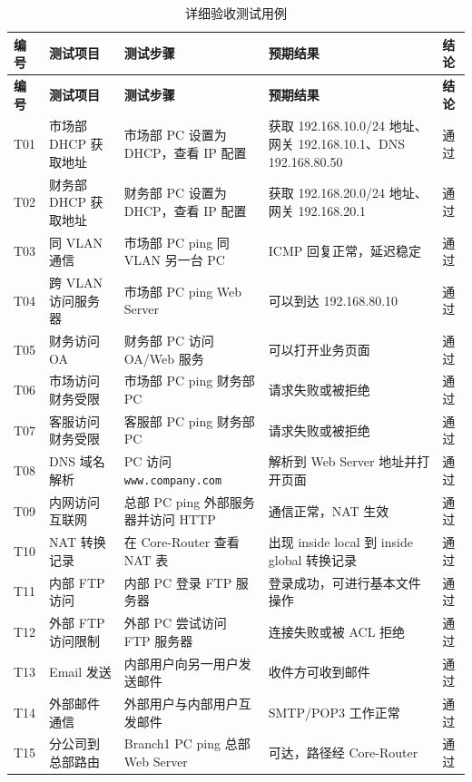 \documentclass[12pt,a4paper]{ctexart}
\begin{document}
\begin{longtable}{|p{1.3cm}|p{3.1cm}|p{3.5cm}|p{3.6cm}|p{2.5cm}|}
\caption{详细验收测试用例}
\label{tab:acceptance-detail}\\
\hline
\textbf{编号} & \textbf{测试项目} & \textbf{测试步骤} & \textbf{预期结果} & \textbf{结论} \\ \hline
\endfirsthead
\hline
\textbf{编号} & \textbf{测试项目} & \textbf{测试步骤} & \textbf{预期结果} & \textbf{结论} \\ \hline
\endhead
T01 & 市场部 DHCP 获取地址 & 市场部 PC 设置为 DHCP，查看 IP 配置 & 获取 192.168.10.0/24 地址、网关 192.168.10.1、DNS 192.168.80.50 & 通过 \\ \hline
T02 & 财务部 DHCP 获取地址 & 财务部 PC 设置为 DHCP，查看 IP 配置 & 获取 192.168.20.0/24 地址、网关 192.168.20.1 & 通过 \\ \hline
T03 & 同 VLAN 通信 & 市场部 PC ping 同 VLAN 另一台 PC & ICMP 回复正常，延迟稳定 & 通过 \\ \hline
T04 & 跨 VLAN 访问服务器 & 市场部 PC ping Web Server & 可以到达 192.168.80.10 & 通过 \\ \hline
T05 & 财务访问 OA & 财务部 PC 访问 OA/Web 服务 & 可以打开业务页面 & 通过 \\ \hline
T06 & 市场访问财务受限 & 市场部 PC ping 财务部 PC & 请求失败或被拒绝 & 通过 \\ \hline
T07 & 客服访问财务受限 & 客服部 PC ping 财务部 PC & 请求失败或被拒绝 & 通过 \\ \hline
T08 & DNS 域名解析 & PC 访问 \texttt{www.company.com} & 解析到 Web Server 地址并打开页面 & 通过 \\ \hline
T09 & 内网访问互联网 & 总部 PC ping 外部服务器并访问 HTTP & 通信正常，NAT 生效 & 通过 \\ \hline
T10 & NAT 转换记录 & 在 Core-Router 查看 NAT 表 & 出现 inside local 到 inside global 转换记录 & 通过 \\ \hline
T11 & 内部 FTP 访问 & 内部 PC 登录 FTP 服务器 & 登录成功，可进行基本文件操作 & 通过 \\ \hline
T12 & 外部 FTP 访问限制 & 外部 PC 尝试访问 FTP 服务器 & 连接失败或被 ACL 拒绝 & 通过 \\ \hline
T13 & Email 发送 & 内部用户向另一用户发送邮件 & 收件方可收到邮件 & 通过 \\ \hline
T14 & 外部邮件通信 & 外部用户与内部用户互发邮件 & SMTP/POP3 工作正常 & 通过 \\ \hline
T15 & 分公司到总部路由 & Branch1 PC ping 总部 Web Server & 可达，路径经 Core-Router & 通过 \\ \hline

\end{longtable}
\end{document}
